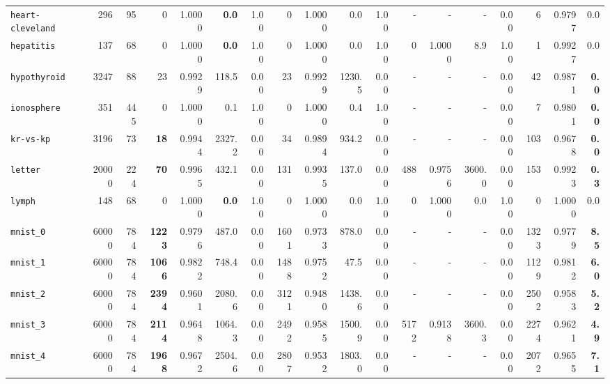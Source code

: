 \begin{tabular}{lccrrrrrrrrrrrrrrr}
\texttt{heart-cleveland} & \multicolumn{1}{r}{296} & \multicolumn{1}{r}{95}  & 0 & 1.0000 & \textbf{0.0} & 1.00 & 0 & 1.0000 & 0.0 & 1.00 & - & - & - & 0.00 & 6 & 0.9797 & 0.0\\
\texttt{hepatitis} & \multicolumn{1}{r}{137} & \multicolumn{1}{r}{68}  & 0 & 1.0000 & \textbf{0.0} & 1.00 & 0 & 1.0000 & 0.0 & 1.00 & 0 & 1.0000 & 8.9 & 1.00 & 1 & 0.9927 & 0.0\\
\texttt{hypothyroid} & \multicolumn{1}{r}{3247} & \multicolumn{1}{r}{88}  & 23 & 0.9929 & 118.5 & 0.00 & 23 & 0.9929 & 1230.5 & 0.00 & - & - & - & 0.00 & 42 & 0.9871 & \textbf{0.0}\\
\texttt{ionosphere} & \multicolumn{1}{r}{351} & \multicolumn{1}{r}{445}  & 0 & 1.0000 & 0.1 & 1.00 & 0 & 1.0000 & 0.4 & 1.00 & - & - & - & 0.00 & 7 & 0.9801 & \textbf{0.0}\\
\texttt{kr-vs-kp} & \multicolumn{1}{r}{3196} & \multicolumn{1}{r}{73}  & \textbf{18} & 0.9944 & 2327.2 & 0.00 & 34 & 0.9894 & 934.2 & 0.00 & - & - & - & 0.00 & 103 & 0.9678 & \textbf{0.0}\\
\texttt{letter} & \multicolumn{1}{r}{20000} & \multicolumn{1}{r}{224}  & \textbf{70} & 0.9965 & 432.1 & 0.00 & 131 & 0.9935 & 137.0 & 0.00 & 488 & 0.9756 & 3600.0 & 0.00 & 153 & 0.9923 & \textbf{0.3}\\
\texttt{lymph} & \multicolumn{1}{r}{148} & \multicolumn{1}{r}{68}  & 0 & 1.0000 & \textbf{0.0} & 1.00 & 0 & 1.0000 & 0.0 & 1.00 & 0 & 1.0000 & 0.0 & 1.00 & 0 & 1.0000 & 0.0\\
\texttt{mnist\_0} & \multicolumn{1}{r}{60000} & \multicolumn{1}{r}{784}  & \textbf{1223} & 0.9796 & 487.0 & 0.00 & 1601 & 0.9733 & 878.0 & 0.00 & - & - & - & 0.00 & 1323 & 0.9779 & \textbf{8.5}\\
\texttt{mnist\_1} & \multicolumn{1}{r}{60000} & \multicolumn{1}{r}{784}  & \textbf{1066} & 0.9822 & 748.4 & 0.00 & 1488 & 0.9752 & 47.5 & 0.00 & - & - & - & 0.00 & 1129 & 0.9812 & \textbf{6.0}\\
\texttt{mnist\_2} & \multicolumn{1}{r}{60000} & \multicolumn{1}{r}{784}  & \textbf{2394} & 0.9601 & 2080.6 & 0.00 & 3121 & 0.9480 & 1438.6 & 0.00 & - & - & - & 0.00 & 2502 & 0.9583 & \textbf{5.2}\\
\texttt{mnist\_3} & \multicolumn{1}{r}{60000} & \multicolumn{1}{r}{784}  & \textbf{2114} & 0.9648 & 1064.3 & 0.00 & 2492 & 0.9585 & 1500.9 & 0.00 & 5172 & 0.9138 & 3600.3 & 0.00 & 2274 & 0.9621 & \textbf{4.9}\\
\texttt{mnist\_4} & \multicolumn{1}{r}{60000} & \multicolumn{1}{r}{784}  & \textbf{1968} & 0.9672 & 2504.6 & 0.00 & 2807 & 0.9532 & 1803.0 & 0.00 & - & - & - & 0.00 & 2072 & 0.9655 & \textbf{7.1}\\

\end{tabular}
